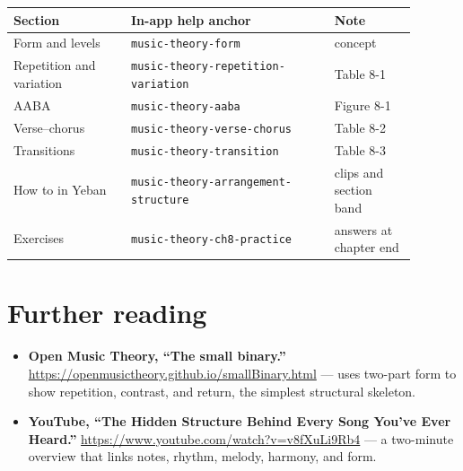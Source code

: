 \begin{center}
\small
\begin{tabular}{p{0.26\linewidth}p{0.45\linewidth}p{0.18\linewidth}}
\toprule
Section & In-app help anchor & Note \\
\midrule
Form and levels & \texttt{music-theory-form} & concept \\
Repetition and variation & \texttt{music-theory-repetition-variation} & Table 8-1 \\
AABA & \texttt{music-theory-aaba} & Figure 8-1 \\
Verse--chorus & \texttt{music-theory-verse-chorus} & Table 8-2 \\
Transitions & \texttt{music-theory-transition} & Table 8-3 \\
How to in Yeban & \texttt{music-theory-arrangement-structure} & clips and section band \\
Exercises & \texttt{music-theory-ch8-practice} & answers at chapter end \\
\bottomrule
\end{tabular}
\end{center}

\section*{Further reading}
\begin{itemize}
  \item \textbf{Open Music Theory, “The small binary.”} \url{https://openmusictheory.github.io/smallBinary.html} — uses two-part form to show repetition, contrast, and return, the simplest structural skeleton.
  \item \textbf{YouTube, “The Hidden Structure Behind Every Song You’ve Ever Heard.”} \url{https://www.youtube.com/watch?v=v8fXuLi9Rb4} — a two-minute overview that links notes, rhythm, melody, harmony, and form.
\end{itemize}

